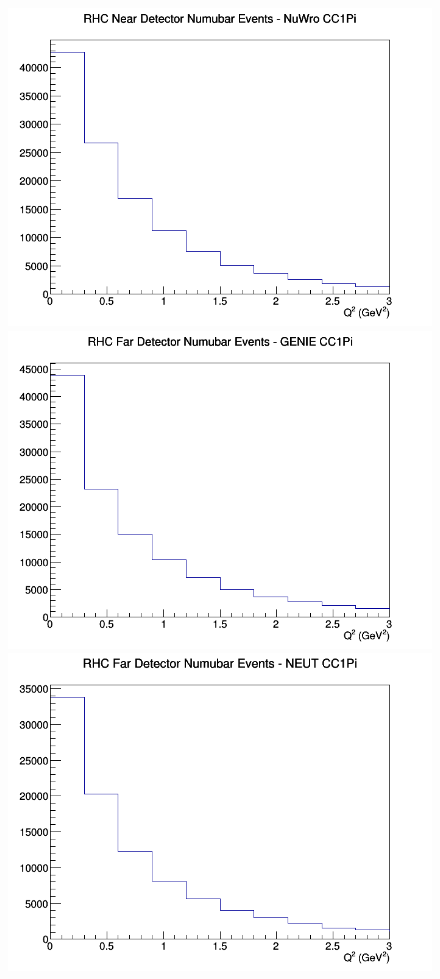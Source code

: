 \documentclass[12pt]{article}
\begin{document}
\begin{figure}[h]
\includegraphics[width=\linewidth]{eff_Q2/LAr/CC1Pi_RHC_ND_numubar_Q2_NuWro.png}
\endminipage
\newline
{}
\includegraphics[width=\linewidth]{eff_Q2/LAr/CC1Pi_RHC_FD_numubar_Q2_GENIE.png}
\endminipage
{}
\includegraphics[width=\linewidth]{eff_Q2/LAr/CC1Pi_RHC_FD_numubar_Q2_NEUT.png}

\end{figure}
\end{document}
